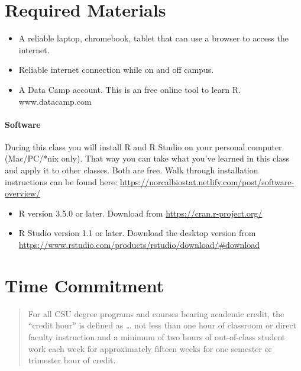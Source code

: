 \documentclass[11pt,]{article}
\providecommand{\tightlist}{%
  \setlength{\itemsep}{0pt}\setlength{\parskip}{0pt}}
\let\oldparagraph\paragraph
\renewcommand{\paragraph}[1]{\oldparagraph{#1}\mbox{}}
\begin{document}
\hypertarget{required-materials}{%
\section{Required Materials}\label{required-materials}}

\begin{itemize}
\tightlist
\item
  A reliable laptop, chromebook, tablet that can use a browser to access
  the internet.
\item
  Reliable internet connection while on and off campus.
\item
  A Data Camp account. This is an free online tool to learn R.
  www.datacamp.com
\end{itemize}

\hypertarget{software}{%
\paragraph{Software}\label{software}}

During this class you will install R and R Studio on your personal
computer (Mac/PC/*nix only). That way you can take what you've learned
in this class and apply it to other classes. Both are free. Walk through
installation instructions can be found here:
\url{https://norcalbiostat.netlify.com/post/software-overview/}

\begin{itemize}
\tightlist
\item
  R version 3.5.0 or later. Download from
  \url{https://cran.r-project.org/}
\item
  R Studio version 1.1 or later. Download the desktop version from
  \url{https://www.rstudio.com/products/rstudio/download/\#download}
\end{itemize}

\hypertarget{time-commitment}{%
\section{Time Commitment}\label{time-commitment}}

\begin{quote}
For all CSU degree programs and courses bearing academic credit, the
``credit hour'' is defined as \ldots{} not less than one hour of
classroom or direct faculty instruction and a minimum of two hours of
out-of-class student work each week for approximately fifteen weeks for
one semester or trimester hour of credit.
\end{quote}
\end{document}
